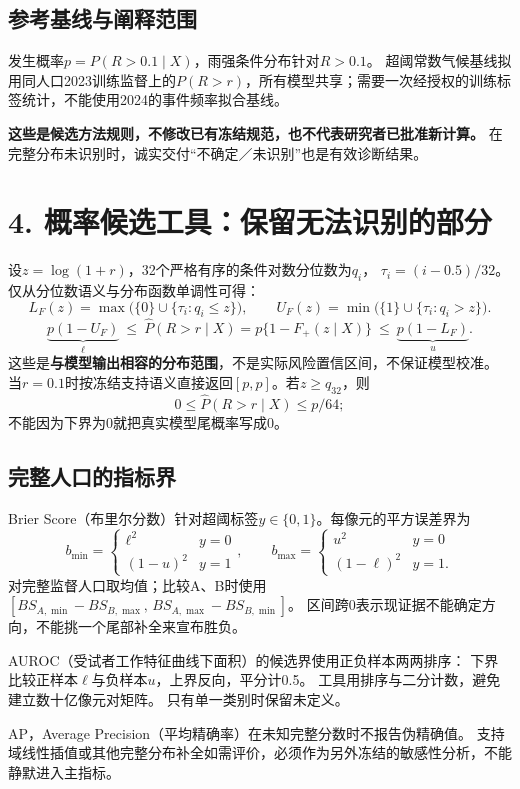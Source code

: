 \documentclass[UTF8,a4paper,10pt,fontset=none]{ctexart}
\newcommand{\key}[1]{\textcolor{ink}{\textbf{#1}}}
\begin{document}
\subsection*{参考基线与阐释范围}
发生概率$p=P(R>0.1\mid X)$，雨强条件分布针对$R>0.1$。
超阈常数气候基线拟用同人口2023训练监督上的$P(R>r)$，所有模型共享；需要一次经授权的训练标签统计，不能使用2024的事件频率拟合基线。

\key{这些是候选方法规则，不修改已有冻结规范，也不代表研究者已批准新计算。}
在完整分布未识别时，诚实交付“不确定／未识别”也是有效诊断结果。

\newpage
\section*{4. 概率候选工具：保留无法识别的部分}
设$z=\log(1+r)$，32个严格有序的条件对数分位数为$q_i$，
$\tau_i=(i-0.5)/32$。仅从分位数语义与分布函数单调性可得：
\[
 L_F(z)=\max\bigl(\{0\}\cup\{\tau_i:q_i\le z\}\bigr),\qquad
 U_F(z)=\min\bigl(\{1\}\cup\{\tau_i:q_i>z\}\bigr).
\]
\[
 \underbrace{p(1-U_F)}_{\ell}\ \le\
 \widehat P(R>r\mid X)=p\{1-F_+(z\mid X)\}
 \ \le\ \underbrace{p(1-L_F)}_{u}.
\]
这些是\textbf{与模型输出相容的分布范围}，不是实际风险置信区间，不保证模型校准。
当$r=0.1$时按冻结支持语义直接返回$[p,p]$。若$z\ge q_{32}$，则
\[
0\le\widehat P(R>r\mid X)\le p/64;
\]
不能因为下界为0就把真实模型尾概率写成0。

\subsection*{完整人口的指标界}
Brier Score（布里尔分数）针对超阈标签$y\in\{0,1\}$。每像元的平方误差界为
\[
 b_{\min}=\begin{cases}\ell^2&y=0\\(1-u)^2&y=1\end{cases},\qquad
 b_{\max}=\begin{cases}u^2&y=0\\(1-\ell)^2&y=1.\end{cases}
\]
对完整监督人口取均值；比较A、B时使用
$[BS_{A,\min}-BS_{B,\max},\,BS_{A,\max}-BS_{B,\min}]$。
区间跨0表示现证据不能确定方向，不能挑一个尾部补全来宣布胜负。

AUROC（受试者工作特征曲线下面积）的候选界使用正负样本两两排序：
下界比较正样本$\ell$与负样本$u$，上界反向，平分计0.5。
工具用排序与二分计数，避免建立数十亿像元对矩阵。
只有单一类别时保留未定义。

AP，Average Precision（平均精确率）在未知完整分数时不报告伪精确值。
支持域线性插值或其他完整分布补全如需评价，必须作为另外冻结的敏感性分析，不能静默进入主指标。
\end{document}
